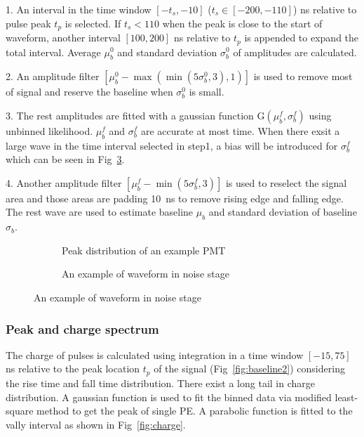 1. An interval in the time window $[-t_s,-10]$ ($t_s\in[-200,-110]$) ns relative to pulse peak $t_p$ is selected. If $t_s<110$ when the peak is close to the start of waveform, another interval $[100,200]$ ns relative to $t_p$ is appended to expand the total interval. Average $\mu_b^0$ and standard deviation $\sigma_b^0$ of amplitudes are calculated.

2. An amplitude filter $[\mu_b^0-\max(\min(5\sigma_b^0,3),1)]$ is used to remove most of signal and reserve the baseline when $\sigma_b^0$ is small.

3. The rest amplitudes are fitted with a gaussian function G$(\mu_b^f,\sigma_b^f)$ using unbinned likelihood. $\mu_b^f$ and $\sigma_b^f$ are accurate at most time. When there exsit a large wave in the time interval selected in step1, a bias will be introduced for $\sigma_b^f$ which can be seen in Fig~\ref{fig:baselineBias2}.

4. Another amplitude filter $[\mu_b^f-\min(5\sigma_b^f,3)]$ is used to reselect the signal area and those areas are padding \SI{10}{ns} to remove rising edge and falling edge. The rest wave are used to estimate baseline $\mu_b$ and standard deviation of baseline $\sigma_b$.
\begin{figure}[!htbp]
    \centering
    \begin{subfigure}[b]{0.7\textwidth}
        \caption{Peak distribution of an example PMT}%
        \label{fig:baselineBias1}
    \end{subfigure}
    \begin{subfigure}[b]{0.3\textwidth}
        \caption{An example of waveform in noise stage}
        \label{fig:baselineBias2}
    \end{subfigure}
\end{figure}

\subsubsection{Peak and charge spectrum}
\label{sec:noisepeak}
The charge of pulses is calculated using integration in a time window $[-15, 75]$ ns relative to the peak location $t_p$ of the signal (Fig~\ref{fig:baseline2}) considering the rise time and fall time distribution. There exist a long tail in charge distribution. A gaussian function is used to fit the binned data via modified least-square method to get the peak of single PE. A parabolic function is fitted to the vally interval as shown in Fig~\ref{fig:charge}.

